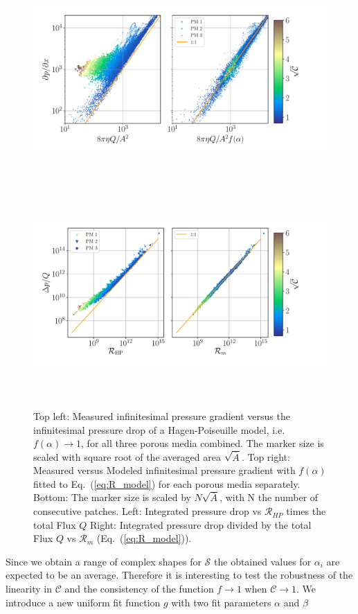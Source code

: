 \documentclass[draft]{agujournal2019}
\begin{document}
\begin{figure}
\includegraphics[height=8cm]{figures/infi_dpdx_combined.pdf}
\includegraphics[height=8cm]{figures/integral_R_combined.pdf}
\caption{Top left: Measured infinitesimal pressure gradient versus the infinitesimal pressure drop of a Hagen-Poiseuille model, i.e. $f(\alpha)\rightarrow 1$, for all three porous media combined. The marker size is scaled with square root of the averaged area $\sqrt{\overline{A}}$. Top right: Measured versus Modeled infinitesimal pressure gradient with $f(\alpha)$ fitted to Eq.~(\ref{eq:R_model}) for each porous media separately. Bottom: The marker size is scaled by $N\sqrt{\overline{A}}$, with N the number of consecutive patches. Left: Integrated pressure drop vs $\mathcal{R}_{HP}$ times the total Flux $Q$ Right: Integrated pressure drop divided by the total Flux $Q$ vs $\mathcal{R}_m$ (Eq.~(\ref{eq:R_model})). }
\label{fig:local_and_integrated}
\end{figure}


Since we obtain a range of complex shapes for $\mathcal{S}$ the obtained values for $\alpha_i$ are expected to be an average. Therefore it is interesting to test the robustness of the linearity in $\mathcal{C}$ and the consistency of the function $f \rightarrow 1$ when $\mathcal{C}\rightarrow 1$. We introduce a new uniform fit function $g$ with two fit parameters $\alpha$ and $\beta$ 
\end{document}
